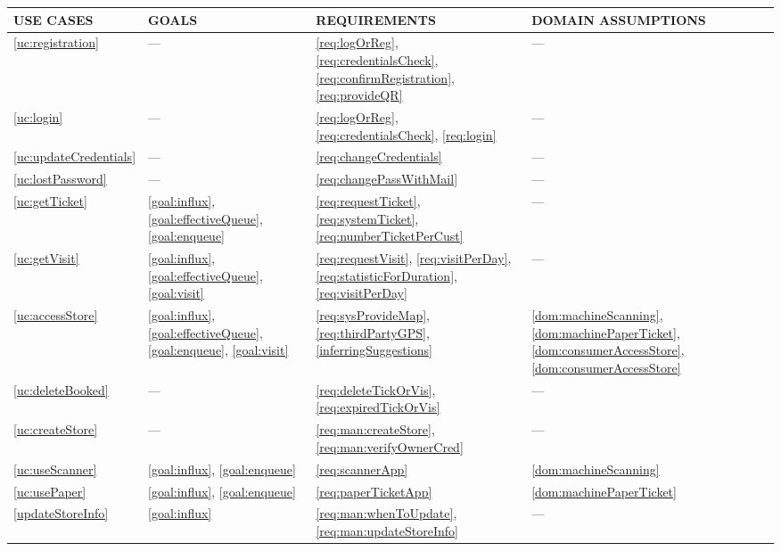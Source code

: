 \documentclass[a4paper, 10pt, oneside]{article}
\begin{document}
\begin{tabularx}{\linewidth}{| p{20mm} | p{20mm} | p{30mm} | p{50mm} |}

     \hline
	USE CASES & GOALS & REQUIREMENTS & DOMAIN ASSUMPTIONS \\
	 \hline
	\ref{uc:registration} & --- & \ref{req:logOrReg}, \ref{req:credentialsCheck}, \ref{req:confirmRegistration}, \ref{req:provideQR}  & ---\\
	
	 \hline
	\ref{uc:login} & --- & \ref{req:logOrReg}, \ref{req:credentialsCheck}, \ref{req:login} & --- \\
	
	\hline
	\ref{uc:updateCredentials} & --- & \ref{req:changeCredentials} & --- \\

	\hline
	\ref{uc:lostPassword} & --- & \ref{req:changePassWithMail} & --- \\
	
	\hline
	\ref{uc:getTicket} & \ref{goal:influx}, \ref{goal:effectiveQueue}, \ref{goal:enqueue} & \ref{req:requestTicket}, \ref{req:systemTicket}, \ref{req:numberTicketPerCust} & --- \\
	\hline
	
	\ref{uc:getVisit} & \ref{goal:influx}, \ref{goal:effectiveQueue}, \ref{goal:visit} & \ref{req:requestVisit}, \ref{req:visitPerDay}, \ref{req:statisticForDuration}, \ref{req:visitPerDay} & --- \\
	\hline
	
	\ref{uc:accessStore} & \ref{goal:influx}, \ref{goal:effectiveQueue}, \ref{goal:enqueue}, \ref{goal:visit} & \ref{req:sysProvideMap}, \ref{req:thirdPartyGPS}, \ref{inferringSuggestions} & \ref{dom:machineScanning}, \ref{dom:machinePaperTicket}, \ref{dom:consumerAccessStore}, \ref{dom:consumerAccessStore} \\
	\hline
	
	\ref{uc:deleteBooked} & --- & \ref{req:deleteTickOrVis}, \ref{req:expiredTickOrVis} & --- \\
    \hline
    
    \ref{uc:createStore} & --- & \ref{req:man:createStore}, \ref{req:man:verifyOwnerCred} & --- \\
    \hline
    
    \ref{uc:useScanner} & \ref{goal:influx}, \ref{goal:enqueue} & \ref{req:scannerApp} & \ref{dom:machineScanning}\\
    \hline
    
    \ref{uc:usePaper} & \ref{goal:influx}, \ref{goal:enqueue} & \ref{req:paperTicketApp} & \ref{dom:machinePaperTicket}\\
    \hline
    
    \ref{updateStoreInfo} & \ref{goal:influx} & \ref{req:man:whenToUpdate}, \ref{req:man:updateStoreInfo} & --- \\
    \hline
    
\end{tabularx}
\end{document}
